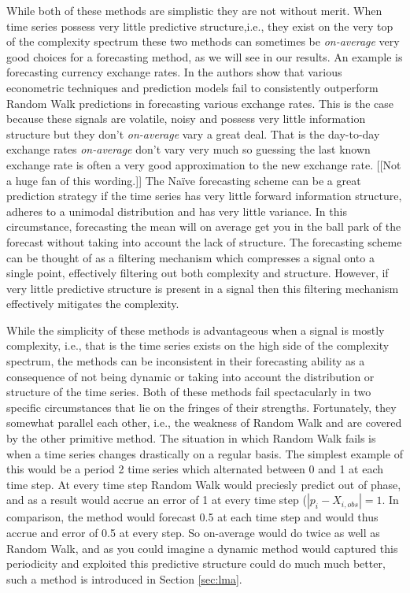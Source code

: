 While both of these methods are simplistic they are not without merit. When time series possess very little predictive structure,i.e., they exist on the very top of the complexity spectrum these two methods can sometimes be \emph{on-average} very good choices for a forecasting method, as we will see in our results. An example is forecasting currency exchange rates. In \cite{rwMeese,rwCCE} the authors show that various econometric techniques and prediction models fail to consistently outperform Random Walk predictions in forecasting various exchange rates. This is the case because these signals are volatile, noisy and possess very little information structure but they don't \emph{on-average} vary a great deal. That is the day-to-day exchange rates \emph{on-average} don't vary very much so guessing the last known exchange rate is often a very good approximation to the new exchange rate. [[Not a huge fan of this wording.]] The Na\"ive forecasting scheme can be a great prediction strategy if the time series has very little forward information structure, adheres to a unimodal distribution and has very little variance. In this circumstance, forecasting the mean will on average get you in the ball park of the forecast without taking into account the lack of structure. The \naive forecasting scheme can be thought of as a filtering mechanism which compresses a signal onto a single point, effectively filtering out both complexity and structure. However, if very little predictive structure is present in a signal then this filtering mechanism effectively mitigates the complexity.     

While the simplicity of these methods is advantageous when a signal is mostly complexity, i.e., that is the time series exists on the high side of the complexity spectrum, the methods can be inconsistent in their forecasting ability as a consequence of not being dynamic or taking into account the distribution or structure of the time series. Both of these methods fail spectacularly in two specific circumstances that lie on the fringes of their strengths. Fortunately, they somewhat parallel each other, i.e., the weakness of Random Walk and \naive are covered by the other primitive method. The situation in which Random Walk fails is when a time series changes drastically on a regular basis. The simplest example of this would be a period 2 time series which alternated between 0 and 1 at each time step. At every time step Random Walk would preciesly predict out of phase, and as a result would accrue an error of 1 at every time step ($|p_i-X_{i,obs}|=1$. In comparison, the \naive method would forecast 0.5 at each time step and would thus accrue and error of 0.5 at every step. So on-average \naive would do twice as well as Random Walk, and as you could imagine a dynamic method would captured this periodicity  and exploited this predictive structure could do much much better, such a method is introduced in Section \ref{sec:lma}. 


